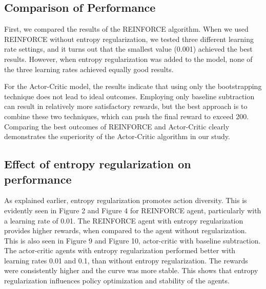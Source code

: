 \documentclass{article}
\begin{document}
\subsection{Comparison of Performance}
\par First, we compared the results of the REINFORCE algorithm. When we used REINFORCE without entropy regularization, we tested three different learning rate settings, and it turns out that the smallest value (0.001) achieved the best results. However, when entropy regularization was added to the model, none of the three learning rates achieved equally good results.
\par For the Actor-Critic model, the results indicate that using only the bootstrapping technique does not lead to ideal outcomes. Employing only baseline subtraction can result in relatively more satisfactory rewards, but the best approach is to combine these two techniques, which can push the final reward to exceed 200.
Comparing the best outcomes of REINFORCE and Actor-Critic clearly demonstrates the superiority of the Actor-Critic algorithm in our study.
\subsection{Effect of entropy regularization on performance}
\par As explained earlier, entropy regularization promotes action diversity. This is evidently seen in Figure 2 and Figure 4 for REINFORCE agent, particularly with a learning rate of 0.01. The REINFORCE agent with entropy regularization provides higher rewards, when compared to the agent without regularization. This is also seen in Figure 9 and Figure 10, actor-critic with baseline subtraction. The actor-critic agents with entropy regularization performed better with learning rates 0.01 and 0.1, than without entropy regularization. The rewards were consistently higher and the curve was more stable. This shows that entropy regularization influences policy optimization and stability of the agents.


\end{document}

